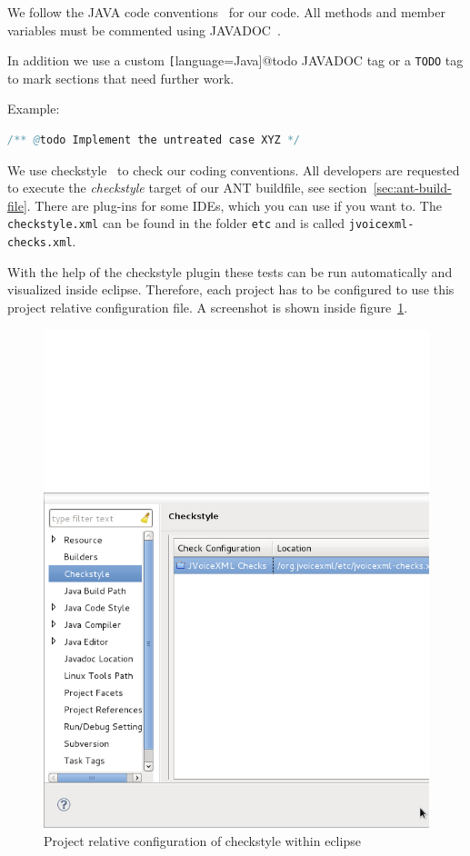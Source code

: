 \documentclass[11pt,a4paper]{article}
\begin{document}
We follow the JAVA code conventions~\cite{sun:codeconv} for our code. All
methods and member variables must be commented using 
JAVADOC~\cite{sun:javadoc_guidelines}.

In addition we use a custom \texttt[language=Java]{@todo} JAVADOC tag or a
\texttt{TODO} tag to mark sections that need further work.

Example:

\begin{lstlisting}[language=Java]
/** @todo Implement the untreated case XYZ */
\end{lstlisting}

We use checkstyle~\cite{checkstyle} to check our coding conventions.
All developers are requested to execute the \emph{checkstyle} target
of our ANT buildfile, see section~\ref{sec:ant-build-file}. 
There are plug-ins for some IDEs, which you can use if you want to. The
\texttt{checkstyle.xml} can be found in the folder 
\texttt{etc} and is called \texttt{jvoicexml-checks.xml}.

With the help of the checkstyle plugin these tests can be run automatically
and visualized inside eclipse. Therefore, each project has to be configured to
use this project relative configuration file. A screenshot is shown inside
figure~\ref{fig:eclipse-project-checkstyle}.
\begin{figure}
\includegraphics[width=\linewidth]{eclipse-project-checkstyle.png}
\caption{Project relative configuration of checkstyle within eclipse}
\label{fig:eclipse-project-checkstyle}
\end{figure}
\end{document}
